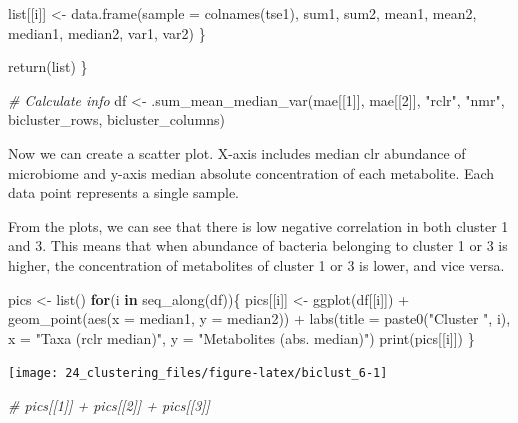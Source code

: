 \documentclass[
]{book}
\newenvironment{Shaded}{\begin{snugshade}}{\end{snugshade}}
\newcommand{\AttributeTok}[1]{\textcolor[rgb]{0.77,0.63,0.00}{#1}}
\newcommand{\CommentTok}[1]{\textcolor[rgb]{0.56,0.35,0.01}{\textit{#1}}}
\newcommand{\ControlFlowTok}[1]{\textcolor[rgb]{0.13,0.29,0.53}{\textbf{#1}}}
\newcommand{\DecValTok}[1]{\textcolor[rgb]{0.00,0.00,0.81}{#1}}
\newcommand{\FunctionTok}[1]{\textcolor[rgb]{0.00,0.00,0.00}{#1}}
\newcommand{\NormalTok}[1]{#1}
\newcommand{\OtherTok}[1]{\textcolor[rgb]{0.56,0.35,0.01}{#1}}
\newcommand{\SpecialCharTok}[1]{\textcolor[rgb]{0.00,0.00,0.00}{#1}}
\newcommand{\StringTok}[1]{\textcolor[rgb]{0.31,0.60,0.02}{#1}}
\begin{document}
\begin{Shaded}
\begin{Highlighting}[]
\NormalTok{    list[[i]] }\OtherTok{\textless{}{-}} \FunctionTok{data.frame}\NormalTok{(}\AttributeTok{sample =} \FunctionTok{colnames}\NormalTok{(tse1), sum1, sum2, mean1, mean2, }
\NormalTok{                     median1, median2, var1, var2)}
\NormalTok{  \}}

  \FunctionTok{return}\NormalTok{(list)}
\NormalTok{\}}

\CommentTok{\# Calculate info}
\NormalTok{df }\OtherTok{\textless{}{-}} \FunctionTok{.sum\_mean\_median\_var}\NormalTok{(mae[[}\DecValTok{1}\NormalTok{]], mae[[}\DecValTok{2}\NormalTok{]], }\StringTok{"rclr"}\NormalTok{, }\StringTok{"nmr"}\NormalTok{, bicluster\_rows, bicluster\_columns)}
\end{Highlighting}
\end{Shaded}

Now we can create a scatter plot. X-axis includes median clr abundance of microbiome
and y-axis median absolute concentration of each metabolite. Each data point represents
a single sample.

From the plots, we can see that there is low negative correlation in both cluster 1 and 3.
This means that when abundance of bacteria belonging to cluster 1 or 3 is higher,
the concentration of metabolites of cluster 1 or 3 is lower, and vice versa.

\begin{Shaded}
\begin{Highlighting}[]
\NormalTok{pics }\OtherTok{\textless{}{-}} \FunctionTok{list}\NormalTok{()}
\ControlFlowTok{for}\NormalTok{(i }\ControlFlowTok{in} \FunctionTok{seq\_along}\NormalTok{(df))\{}
\NormalTok{  pics[[i]] }\OtherTok{\textless{}{-}} \FunctionTok{ggplot}\NormalTok{(df[[i]])  }\SpecialCharTok{+}
      \FunctionTok{geom\_point}\NormalTok{(}\FunctionTok{aes}\NormalTok{(}\AttributeTok{x =}\NormalTok{ median1, }\AttributeTok{y =}\NormalTok{ median2)) }\SpecialCharTok{+} 
      \FunctionTok{labs}\NormalTok{(}\AttributeTok{title =} \FunctionTok{paste0}\NormalTok{(}\StringTok{"Cluster "}\NormalTok{, i),}
           \AttributeTok{x =} \StringTok{"Taxa (rclr median)"}\NormalTok{,}
           \AttributeTok{y =} \StringTok{"Metabolites (abs. median)"}\NormalTok{)}
  \FunctionTok{print}\NormalTok{(pics[[i]])}
\NormalTok{\}}
\end{Highlighting}
\end{Shaded}

\texttt{[image: 24\_clustering\_files/figure-latex/biclust\_6-1]}

\begin{Shaded}
\begin{Highlighting}[]
\CommentTok{\# pics[[1]] + pics[[2]] + pics[[3]]}
\end{Highlighting}
\end{Shaded}
\end{document}
